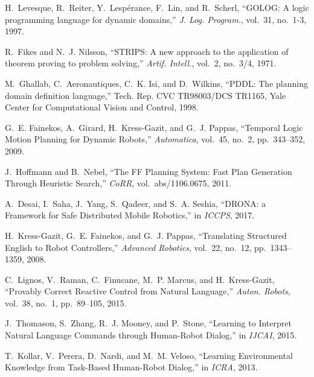 \documentclass[letterpaper, 10 pt, conference]{ieeeconf}  %
\begin{document}



\begin{thebibliography}{10}

H.~Levesque, R.~Reiter, Y.~Lesp{\'{e}}rance, F.~Lin, and R.~Scherl, ``{GOLOG:}
  {A} logic programming language for dynamic domains,'' {\em J. Log. Program.},
  vol.~31, no.~1-3, 1997.

R.~Fikes and N.~J. Nilsson, ``{STRIPS:} {A} new approach to the application of
  theorem proving to problem solving,'' {\em Artif. Intell.}, vol.~2, no.~3/4,
  1971.

M.~Ghallab, C.~Aeronautiques, C.~K. Isi, and D.~Wilkins, ``{PDDL}: The planning
  domain definition language,'' Tech. Rep. CVC TR98003/DCS TR1165, Yale Center
  for Computational Vision and Control, 1998.

G.~E. Fainekos, A.~Girard, H.~Kress{-}Gazit, and G.~J. Pappas, ``{Temporal
  Logic Motion Planning for Dynamic Robots},'' {\em Automatica}, vol.~45,
  no.~2, pp.~343--352, 2009.

J.~Hoffmann and B.~Nebel, ``{The FF Planning System: Fast Plan Generation
  Through Heuristic Search},'' {\em CoRR}, vol.~abs/1106.0675, 2011.

A.~Desai, I.~Saha, J.~Yang, S.~Qadeer, and S.~A. Seshia, ``{DRONA: a Framework
  for Safe Distributed Mobile Robotics},'' in {\em ICCPS}, 2017.

H.~Kress{-}Gazit, G.~E. Fainekos, and G.~J. Pappas, ``{Translating Structured
  English to Robot Controllers},'' {\em Advanced Robotics}, vol.~22, no.~12,
  pp.~1343--1359, 2008.

C.~Lignos, V.~Raman, C.~Finucane, M.~P. Marcus, and H.~Kress{-}Gazit,
  ``{Provably Correct Reactive Control from Natural Language},'' {\em Auton.
  Robots}, vol.~38, no.~1, pp.~89--105, 2015.

J.~Thomason, S.~Zhang, R.~J. Mooney, and P.~Stone, ``{Learning to Interpret
  Natural Language Commands through Human-Robot Dialog},'' in {\em IJCAI},
  2015.

T.~Kollar, V.~Perera, D.~Nardi, and M.~M. Veloso, ``{Learning Environmental
  Knowledge from Task-Based Human-Robot Dialog},'' in {\em ICRA}, 2013.


\end{thebibliography}
\end{document}
